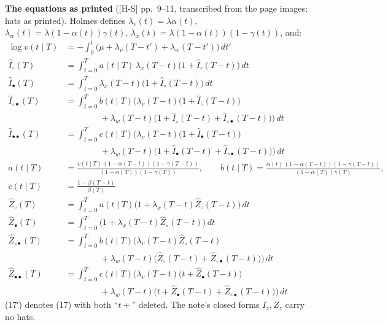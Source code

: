 \documentclass[10pt,]{article}
\begin{document}
\textbf{The equations as printed} ({[}H-S{]} pp.~9--11, transcribed from
the page images; hats as printed). Holmes defines
\(\lambda_v(t)=\lambda\alpha(t)\),
\(\lambda_w(t)=\lambda(1-\alpha(t))\gamma(t)\),
\(\lambda_x(t)=\lambda(1-\alpha(t))(1-\gamma(t))\), and: \begin{align*}
\log v(t\mid T)&=-\int_0^t\big(\mu+\lambda_v(T-t')+\lambda_w(T-t')\big)\,dt' \tag*{(8)}\\
\hat I_\circ(T)&=\int_{t=0}^T a(t\mid T)\,\lambda_x(T-t)\big(1+\hat I_\circ(T-t)\big)\,dt \tag*{(9)}\\
\hat I_\bullet(T)&=\int_{t=0}^T \lambda_x(T-t)\big(1+\hat I_\circ(T-t)\big)\,dt \tag*{(10)}\\
\hat I_{\circ\bullet}(T)&=\int_{t=0}^T b(t\mid T)\Big(\lambda_v(T-t)\big(1+\hat I_\circ(T-t)\big)\\
&\qquad\qquad+\lambda_w(T-t)\big(1+\hat I_\circ(T-t)+\hat I_{\circ\bullet}(T-t)\big)\Big)\,dt \tag*{(11)}\\
\hat I_{\bullet\bullet}(T)&=\int_{t=0}^T c(t\mid T)\Big(\lambda_v(T-t)\big(1+\hat I_\bullet(T-t)\big)\\
&\qquad\qquad+\lambda_w(T-t)\big(1+\hat I_\bullet(T-t)+\hat I_{\circ\bullet}(T-t)\big)\Big)\,dt \tag*{(12)}\\
a(t\mid T)&=\frac{v(t\mid T)\,(1-\alpha(T-t))(1-\gamma(T-t))}{(1-\alpha(T))(1-\gamma(T))},\qquad
b(t\mid T)=\frac{\alpha(t)\,(1-\alpha(T-t))(1-\gamma(T-t))}{(1-\alpha(T))\gamma(T)},\\
c(t\mid T)&=\frac{1-\beta(T-t)}{\beta(T)} \tag*{(13)}\\
\hat Z_\circ(T)&=\int_{t=0}^T a(t\mid T)\big(1+\lambda_x(T-t)\hat Z_\circ(T-t)\big)\,dt \tag*{(14)}\\
\hat Z_\bullet(T)&=\int_{t=0}^T \big(1+\lambda_x(T-t)\hat Z_\circ(T-t)\big)\,dt \tag*{(15)}\\
\hat Z_{\circ\bullet}(T)&=\int_{t=0}^T b(t\mid T)\Big(\lambda_v(T-t)\hat Z_\circ(T-t)\\
&\qquad\qquad+\lambda_w(T-t)\big(\hat Z_\circ(T-t)+\hat Z_{\circ\bullet}(T-t)\big)\Big)\,dt \tag*{(16)}\\
\hat Z_{\bullet\bullet}(T)&=\int_{t=0}^T c(t\mid T)\Big(\lambda_v(T-t)\big(t+\hat Z_\bullet(T-t)\big)\\
&\qquad\qquad+\lambda_w(T-t)\big(t+\hat Z_\bullet(T-t)+\hat Z_{\circ\bullet}(T-t)\big)\Big)\,dt \tag*{(17)}
\end{align*} (17′) denotes (17) with both ``\(t+\)'' deleted. The note's
closed forms \(I_z,Z_z\) carry no hats.
\end{document}
